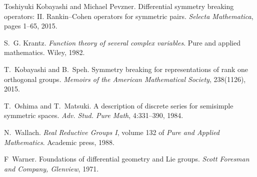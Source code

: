 \documentclass{article}
\newcommand{\tmtextit}[1]{{\itshape{#1}}}
\numberwithin{definition}{section}
\numberwithin{lemma}{section}
\numberwithin{proposition}{section}
{\theorembodyfont{\rmfamily}\newtheorem{remark}{Remark}
\numberwithin{remark}{section}
}
\begin{document}
\begin{thebibliography}{CK{\O}P11}
  Toshiyuki Kobayashi and Michael
  Pevzner. {\newblock}Differential symmetry breaking operators: II.
  Rankin--Cohen operators for symmetric pairs. {\newblock}\tmtextit{Selecta
  Mathematica}, pages 1--65, 2015.
  
  S.~G. Krantz.
  {\newblock}\tmtextit{Function theory of several complex variables}.
  {\newblock}Pure and applied mathematics. Wiley, 1982.
  
  T.~Kobayashi and B.~Speh.
  {\newblock}Symmetry breaking for representations of rank one orthogonal
  groups. {\newblock}\tmtextit{Memoirs of the American Mathematical Society},
  238(1126), 2015.
  
  T.~Oshima and T.~Matsuki. {\newblock}A
  description of discrete series for semisimple symmetric spaces.
  {\newblock}\tmtextit{Adv. Stud. Pure Math}, 4:331--390, 1984.
  
  N.~Wallach. {\newblock}\tmtextit{Real
  Reductive Groups I}, volume 132 of \tmtextit{Pure and Applied Mathematics}.
  {\newblock}Academic press, 1988.
  
  F~Warner. {\newblock}Foundations of
  differential geometry and Lie groups. {\newblock}\tmtextit{Scott Foresman
  and Company, Glenview}, 1971.
\end{thebibliography}
\end{document}
